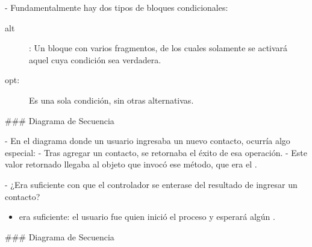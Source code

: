 - Fundamentalmente hay dos tipos de bloques condicionales:

\begin{description}
    \item[alt]: Un bloque con varios fragmentos, de los cuales solamente se activará aquel cuya
    condición sea verdadera.
    \item[opt:] Es una sola condición, sin otras alternativas.
\end{description}

### Diagrama de Secuencia


\newline

- En el diagrama donde un usuario ingresaba un nuevo contacto, ocurría algo especial:
    - Tras agregar un contacto, se retornaba el éxito de esa operación.
    - Este valor retornado llegaba al objeto que invocó ese método, que era el .

\vfill

- ¿Era suficiente con que el controlador se enterase del resultado de ingresar un contacto?

\pause

\begin{rboxx}{}
    \begin{itemize}
        \item {} era suficiente: el usuario fue quien inició el proceso y esperará algún .
    \end{itemize}
\end{rboxx}

### Diagrama de Secuencia


